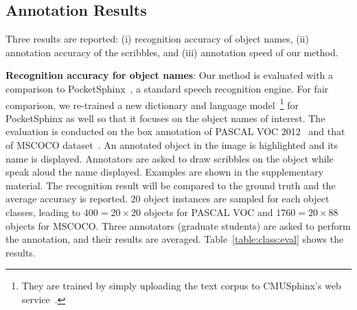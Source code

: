 


 




\subsection{Annotation Results}
Three results are reported: (i) recognition accuracy of object names,
(ii) annotation accuracy of the scribbles, and (iii) annotation speed
of our method.

\textbf{Recognition accuracy for object names}: Our method is
evaluated with a comparison to PocketSphinx~\citep{sphinx}, a standard
speech recognition engine. For fair comparison, we re-trained a new
dictionary and language model~\footnote{They are trained by simply
  uploading the text corpus to CMUSphinx's web
  service~\citep{sphinx:webtrain}.}  for PocketSphinx as well so that
it focuses on the object names of interest.  The evaluation is
conducted on the box annotation of PASCAL VOC 2012~\citep{pascal:2011}
and that of MSCOCO dataset~\citep{coco:eccv}.  An annotated object in
the image is highlighted and its name is displayed. Annotators are
asked to draw scribbles on the object while speak aloud the name
displayed.  Examples are shown in the supplementary material.  The
recognition result will be compared to the ground truth and the
average accuracy is reported. $20$ object instances are sampled for
each object classes, leading to $400=20\times 20$ objects for PASCAL
VOC and $1760=20\times 88$ objects for MSCOCO. Three annotators
(graduate students) are asked to perform the annotation, and their
results are averaged. Table~\ref{table:class:eval} shows the results.

